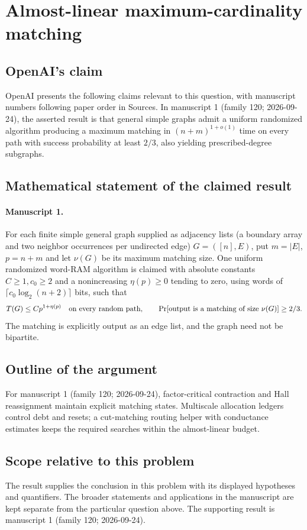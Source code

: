 \documentclass[11pt]{article}
\begin{document}
\section*{Almost-linear maximum-cardinality matching}

\subsection{OpenAI's claim}
OpenAI presents the following claims relevant to this question, with manuscript numbers following paper order in Sources. In manuscript 1 (family 120; 2026-09-24), the asserted result is that general simple graphs admit a uniform randomized algorithm producing a maximum matching in $(n+m)^{1+o(1)}$ time on every path with success probability at least $2/3$, also yielding prescribed-degree subgraphs.

\subsection{Mathematical statement of the claimed result}
\paragraph{Manuscript 1.}
For each finite simple general graph supplied as adjacency lists (a boundary array and two neighbor occurrences per undirected edge) $G=([n],E)$, put $m=|E|$, $p=n+m$ and let $\nu(G)$ be its maximum matching size. One uniform randomized word-RAM algorithm is claimed with absolute constants $C\ge1,c_0\ge2$ and a nonincreasing $\eta(p)\ge0$ tending to zero, using words of $\lceil c_0\log_2(n+2)\rceil$ bits, such that
\[
 T(G)\le Cp^{1+\eta(p)}\quad\hbox{on every random path},\qquad
 \Pr[\text{output is a matching of size }\nu(G)]\ge2/3.
\]
The matching is explicitly output as an edge list, and the graph need not be bipartite.

\subsection{Outline of the argument}
For manuscript 1 (family 120; 2026-09-24), factor-critical contraction and Hall reassignment maintain explicit matching states. Multiscale allocation ledgers control debt and resets; a cut-matching routing helper with conductance estimates keeps the required searches within the almost-linear budget.

\subsection{Scope relative to this problem}
The result supplies the conclusion in this problem with its displayed hypotheses and quantifiers. The broader statements and applications in the manuscript are kept separate from the particular question above. The supporting result is manuscript 1 (family 120; 2026-09-24).
\end{document}
